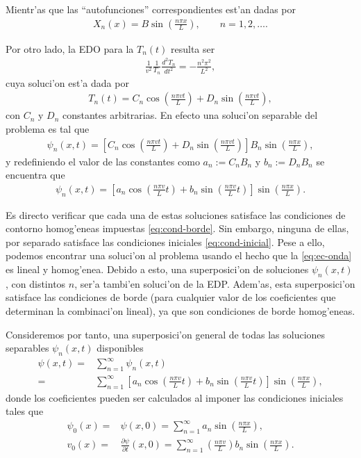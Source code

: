 Mientr'as que las ``autofunciones'' correspondientes est'an dadas por
\begin{align}
X_{n}(x)=B\sin\left(\frac{n \pi x}{L}\right),\qquad n=1,2,\hdots.
\end{align}

Por otro lado, la EDO para la $T_{n}(t)$ resulta ser
\begin{align}
\frac{1}{v^2}\frac{1}{T_{n}}\frac{d^2 T_{n}}{dt^2}=-\frac{n^2 \pi^2}{L^2},
\end{align}
cuya soluci'on est'a dada por
\begin{align}
T_{n}(t)=C_{n}\cos\left(\frac{n \pi vt}{L}\right)+D_{n}\sin\left(\frac{n\pi vt}{L}\right),
\end{align}
con $C_{n}$ y $D_{n}$ constantes arbitrarias. En efecto una soluci'on separable del problema es tal que
\begin{align}
\psi_{n}(x,t)=\left[C_{n}\cos\left(\frac{n \pi vt}{L}\right)+D_{n}\sin\left(\frac{n\pi vt}{L}\right) \right]B_{n}\sin\left(\frac{n \pi x}{L}\right),
\end{align}
y redefiniendo el valor de las constantes como $a_{n}:=C_{n}B_{n}$ y $b_{n}:=D_{n}B_{n}$ se encuentra que
\begin{align}
\psi_{n}(x,t)=\left[a_{n}\cos\left(\frac{n \pi v}{L}t\right)+b_{n}\sin\left(\frac{n \pi v}{L}t\right)\right] \sin\left(\frac{n\pi x}{L}\right).
\end{align}

Es directo verificar que cada una de estas soluciones satisface las condiciones de contorno homog'eneas impuestas \eqref{eq:cond-borde}. Sin embargo, ninguna de ellas, por separado satisface las condiciones iniciales \eqref{eq:cond-inicial}. Pese a ello, podemos encontrar una soluci'on al problema usando el hecho que la \eqref{eq:ec-onda} es lineal y homog'enea. Debido a esto, una superposici'on de soluciones $\psi_{n}(x,t)$, con distintos $n$, ser'a tambi'en soluci'on de la EDP. Adem'as, esta superposici'on satisface las condiciones de borde (para cualquier valor de los coeficientes que determinan la combinaci'on lineal), ya que son condiciones de borde homog'eneas.

Consideremos por tanto, una superposici'on general de todas las soluciones separables $\psi_{n}(x,t)$ disponibles
\begin{align}
\psi(x,t)=&\sum_{n=1}^{\infty}\psi_{n}(x,t)\\
=&\sum_{n=1}^{\infty}\left[a_{n}\cos\left(\frac{n \pi v}{L}t\right)+b_{n}\sin\left(\frac{n \pi v}{L}t\right)\right] \sin\left(\frac{n\pi x}{L}\right),
\end{align}
donde los coeficientes pueden ser calculados al imponer las condiciones iniciales tales que
\begin{align}
\psi_{0}(x)=&\psi(x,0)=\sum_{n=1}^{\infty}a_{n}\sin\left(\frac{n \pi x}{L}\right),\label{eq:psi0}\\
v_{0}(x)=&\frac{\partial \psi}{\partial t}(x,0)=\sum_{n=1}^{\infty}\left( \frac{n \pi v}{L}\right) b_{n}\sin\left( \frac{n \pi x}{L}\right).\label{eq:v0}
\end{align}

